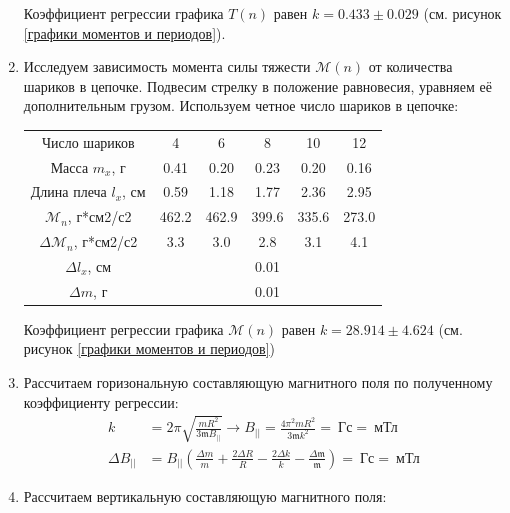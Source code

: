 \documentclass[a4paper, 10pt]{article}
\begin{document}
\begin{enumerate}
\begin{center}
\begin{tabular}{|c|c|c|c|c|c|c|c|c|c|c|}
        \end{tabular}
    \end{center}
    Коэффициент регрессии графика $T(n)$ равен $k = 0.433\pm 0.029$ (см. рисунок \ref{графики моментов и периодов}).
    \item Исследуем зависимость момента силы тяжести $\mathcal{M}(n)$ от количества шариков в цепочке. Подвесим стрелку в положение равновесия, уравняем её дополнительным грузом. Используем четное число шариков в цепочке:
    \begin{center}
        \begin{tabular}{|c|c|c|c|c|c|}
            \hline
            Число шариков & 4 & 6 & 8 & 10 & 12\\
            Масса $m_{x}$, г & 0.41 & 0.20 & 0.23 & 0.20 & 0.16\\
            Длина плеча $l_{x}$, см & 0.59 & 1.18 & 1.77 & 2.36 & 2.95\\
            $\mathcal{M}_{n}$, г*см2/с2 & 462.2 & 462.9 & 399.6 & 335.6 & 273.0\\
            $\Delta \mathcal{M}_{n}$, г*см2/с2 & 3.3 & 3.0 & 2.8 & 3.1 & 4.1\\
            \hline
            $\Delta l_{x}$, см & \multicolumn{5}{|c|}{0.01}\\
            $\Delta m$, г & \multicolumn{5}{|c|}{0.01}\\
            \hline
        \end{tabular}
        \label{дополнительный груз для магнитной стрелки}
    \end{center}
    Коэффициент регрессии графика $\mathcal{M}(n)$ равен $k = 28.914\pm 4.624$ (см. рисунок \ref{графики моментов и периодов})
    \item Рассчитаем горизональную составляющую магнитного поля по полученному коэффициенту регрессии:
    \begin{align*}
        k & = 2\pi \sqrt{\frac{mR^{2}}{3\mathfrak{m}{B_{||}}}} \rightarrow {B_{||}} = \frac{4\pi^{2}mR^{2}}{3\mathfrak{m}k^{2}} = \ \text{Гс} = \ \text{мТл}\\
        \Delta {B_{||}} & = {B_{||}}\left(\frac{\Delta m}{m} + \frac{2\Delta R}{R} - \frac{2\Delta k}{k} - \frac{\Delta \mathfrak{m}}{\mathfrak{m}}\right) = \ \text{Гс} = \ \text{мТл}
    \end{align*}
    \item Рассчитаем вертикальную составляющую магнитного поля:

\end{enumerate}
\end{document}
